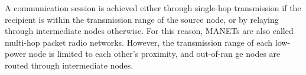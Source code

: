 \documentclass[letterpaper, 10 pt, conference]{ieeeconf}  %
\begin{document}
 A communication session is achieved either
through single-hop transmission if the recipient is
within the transmission range of the source node,
or by relaying through intermediate nodes otherwise.
For this reason, MANETs are also called
multi-hop packet radio networks. However, the
transmission range of each low-power node is limited
to each other’s proximity, and out-of-ran ge
nodes are routed through intermediate nodes.










\end{document}
